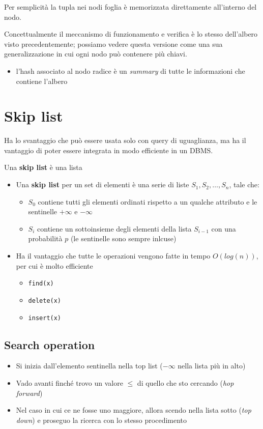 \documentclass{report}
\begin{document}
\noindent Per semplicità la tupla nei nodi foglia è memorizzata direttamente all'interno del nodo.

\noindent Concettualmente il meccanismo di funzionamento e verifica è lo stesso dell'albero visto precedentemente; possiamo vedere 
questa versione come una sua generalizzazione in cui ogni nodo può contenere più chiavi.
\begin{itemize}
    \item l'hash associato al nodo radice è un \textit{summary} di tutte le informazioni che contiene l'albero 
\end{itemize}




\section{Skip list}
Ha lo svantaggio che può essere usata solo con query di uguaglianza, ma ha il vantaggio 
di poter essere integrata in modo efficiente in un DBMS.

\noindent Una \textbf{skip list} è una lista



\begin{itemize}
    \item Una \textbf{skip list} per un set di elementi è una serie di liste $S_1, S_2, \dots, S_n$, tale che:
    \begin{itemize}
        \item $S_0$ contiene tutti gli elementi ordinati rispetto a un qualche attributo e le sentinelle $+\infty$ e $-\infty$
        \item $S_i$ contiene un sottoinsieme degli elementi della lista $S_{i-1}$ con una probabilità $p$ (le sentinelle sono sempre inlcuse)
    \end{itemize}
    \item Ha il vantaggio che tutte le operazioni vengono fatte in tempo $O(log(n))$, per cui è molto efficiente
    \begin{itemize}
        \item \texttt{find(x)}
        \item \texttt{delete(x)}
        \item \texttt{insert(x)}
    \end{itemize}
\end{itemize}

\subsection{Search operation}
\begin{itemize}
    \item Si inizia dall'elemento sentinella nella top list ($-\infty$ nella lista più in alto)
    \item Vado avanti finché trovo un valore $\leq$ di quello che sto cercando (\textit{hop forward})
    \item Nel caso in cui ce ne fosse uno maggiore, allora scendo nella lista sotto (\textit{top down}) e proseguo 
    la ricerca con lo stesso procedimento
\end{itemize}
\end{document}
